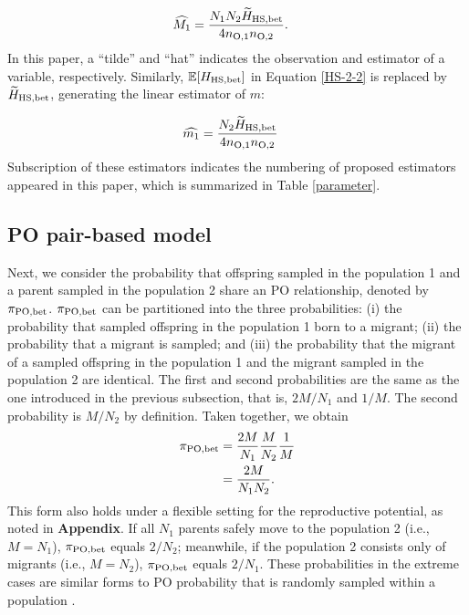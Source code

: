 \documentclass[12pt, English]{article}
\begin{document}
\begin{spacing}{1.9}
\begin{align}
\widehat{M_1} &= \frac{N_{1} N_{2} \widetilde{H}_{\rm HS, bet} } {4 n_{\rm O, 1} n_{\rm O, 2} }.
\label{HS-3}
\end{align}
In this paper, a ``tilde'' and ``hat'' indicates the observation and estimator of a variable, respectively. Similarly, $\mathbb{E}[H_{\rm HS, bet}]$ in Equation \ref{HS-2-2} is replaced by $\widetilde{H}_{\rm HS, bet}$, generating the linear estimator of $m$:

\begin{align}
\widehat{m_1} &= \frac{N_{2} \widetilde{H}_{\rm HS, bet} } {4 n_{\rm O, 1} n_{\rm O, 2} }
\label{HS-4}
\end{align}
Subscription of these estimators indicates the numbering of proposed estimators appeared in this paper, which is summarized in Table \ref{parameter}. 

\begin{center}
\end{center}

\subsection{PO pair-based model}

Next, we consider the probability that offspring sampled in the population 1 and a parent sampled in the population 2 share an PO relationship, denoted by $\pi_{\rm PO, bet}$. $\pi_{\rm PO, bet}$ can be partitioned into the three probabilities: (i) the probability that sampled offspring in the population 1 born to a migrant; (ii) the probability that a migrant is sampled; and (iii) the probability that the migrant of a sampled offspring in the population 1 and the migrant sampled in the population 2 are identical. The first and second probabilities are the same as the one introduced in the previous subsection, that is, $2M/N_{1}$ and $1/M$. The second probability is $M/N_{2}$ by definition. Taken together, we obtain
\begin{align}
\pi_{\rm PO,bet} &= \frac{2M}{N_{1}} \frac{M}{N_{2}} \frac{1}{M} \nonumber\\
&= \frac{2M}{N_{1}N_{2}}.
\label{PO-1}
\end{align}
This form also holds under a flexible setting for the reproductive potential, as noted in {\bf Appendix}. If all $N_1$ parents safely move to the population 2 (i.e., $M = N_1$), $\pi_{\rm PO,bet}$ equals $2/N_2$; meanwhile, if the population 2 consists only of migrants (i.e., $M = N_2$), $\pi_{\rm PO,bet}$ equals $2/N_1$. These probabilities in the extreme cases are similar forms to PO probability that is randomly sampled within a population \cite[]{bravington2016close}. 


\end{spacing}
\end{document}
